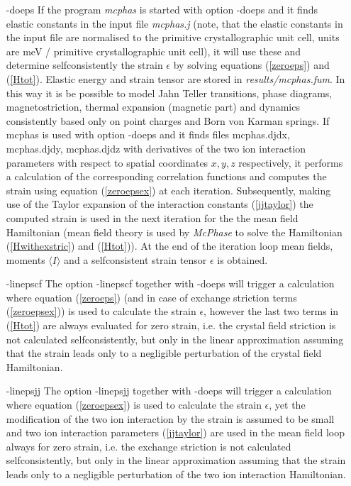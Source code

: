 \begin{itemize}
\item[{\prg -doeps}]
If the program {\em mcphas} is started with option {\prg -doeps}
and it finds elastic constants in the input file {\em mcphas.j} (note, that the elastic constants
in the input file are normalised to the primitive crystallographic unit cell, units are 
meV / primitive crystallographic unit cell), it
 will use these and determine selfconsistently the strain $\epsilon$ by solving equations
(\ref{zeroeps}) and (\ref{Htot}). Elastic energy and strain tensor are stored in {\em results/mcphas.fum}.
 In this way it is be possible to model Jahn Teller transitions,
phase diagrams, magnetostriction, thermal expansion (magnetic part) and dynamics consistently based
only on point charges and Born von Karman springs. 
If {\prg mcphas} is used with option {\prg -doeps} and it finds files {\prg mcphas.djdx}, {\prg mcphas.djdy}, {\prg mcphas.djdz} with
derivatives of the two ion interaction parameters with respect to
spatial coordinates $x,y,z$ respectively, it performs a calculation of
the corresponding correlation functions and computes the strain  using
equation (\ref{zeroepsex}) at each iteration. Subsequently, making use of the Taylor expansion
of the interaction constants (\ref{jjtaylor}) the computed strain is used 
in the next iteration for the the mean field Hamiltonian 
(mean field theory is used by {\em McPhase}
to solve the Hamiltonian (\ref{Hwithexstric}) and (\ref{Htot})). 
At the end of the iteration loop mean fields, moments $\langle I \rangle$ and 
a selfconsistent strain tensor $\epsilon$ is obtained.
 
\item[{\prg -linepscf}]
The option {\prg -linepscf} together with {\prg -doeps} will trigger 
a calculation where equation (\ref{zeroeps}) (and in case
of exchange striction terms (\ref{zeroepsex}))
is used to calculate the strain $\epsilon$, however the last two terms in
(\ref{Htot}) are always evaluated
for zero strain, i.e. the crystal field striction is not calculated
selfconsistently, but only in the linear approximation assuming that the 
strain leads only to a negligible perturbation of the crystal field
Hamiltonian. 

\item[{\prg -linepsjj}]
The option {\prg -linepsjj} together with {\prg -doeps} will trigger 
a calculation where equation (\ref{zeroepsex})
is used to calculate the strain $\epsilon$, yet the modification of
the two ion interaction by the strain is assumed to be small
and two ion interaction parameters (\ref{jjtaylor}) are used
in the mean field loop always for zero strain, i.e. the exchange striction is not calculated
selfconsistently, but only in the linear approximation assuming that the 
strain leads only to a negligible perturbation of the two ion interaction
Hamiltonian.


\end{itemize}


